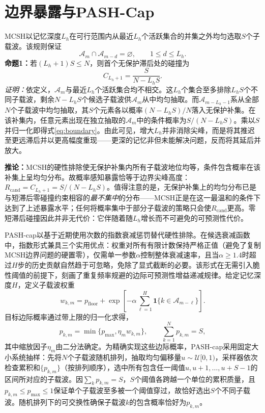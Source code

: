 \documentclass[lettersize,journal]{IEEEtran}
\begin{document}
\section{边界暴露与PASH-Cap}
MCSH以记忆深度$L_h$在可行范围内从最近$L_h$个活跃集合的并集之外均匀选取$S$个子载波。该规则保证
\begin{equation}
\mathcal A_m\cap\mathcal A_{m-d}=\varnothing,\qquad 1\leq d\leq L_h.
\end{equation}
\textbf{命题1：}若$(L_h+1)S\leq N$，则首个无保护滞后处的碰撞为
\begin{equation}
C_{L_h+1}=\frac{S}{N-L_hS}.
\label{eq:boundary}
\end{equation}
\emph{证明：}依定义，$\mathcal A_m$与最近$L_h$个活跃集合均不相交。这$L_h$个集合至多排除$L_hS$个不同子载波，剩余$N-L_hS$个候选子载波供$\mathcal A_m$从中均匀抽取。而$\mathcal A_{m-L_h-1}$系从全部$N$个子载波中均匀抽取，其$S$个元素各以概率$(N-L_hS)/N$落入无保护补集。在该补集内，任意元素出现在独立抽取的$\mathcal A_m$中的条件概率为$S/(N-L_hS)$。乘以$S$并归一化即得式\eqref{eq:boundary}。由此可见，增大$L_h$并非消除尖峰，而是将其推迟至更远滞后并以更高幅度重现——更深的记忆非但未能解决问题，反而将其延后并放大。

\textbf{推论：}MCSH的硬性排除使无保护补集内所有子载波地位均等，条件包含概率在该补集上呈均匀分布。故概率感知暴露恰等于边界尖峰高度：$R_{\mathrm{cand}}=C_{L_h+1}=S/(N-L_hS)$。值得注意的是，无保护补集上的均匀分布已是与短滞后零碰撞约束相容的\emph{最不集中}的分布——MCSH正是在这一最温和的条件下达到了上述暴露水平；任何将概率集中于部分子载波的策略只会使$R_{\mathrm{cand}}$更高。零短滞后碰撞因此并非无代价：它伴随着随$L_h$增长而不可避免的可预测性代价。

PASH-cap以基于近期使用次数的指数衰减惩罚替代硬性排除。在候选衰减函数中，指数形式兼具三个实用优点：权重对所有有限计数保持严格正值（避免了复制MCSH边界问题的硬置零），仅需单一参数$\alpha$控制整体衰减速率，且当$\alpha\geq1.4$时超过$H$步的历史贡献自然趋于可忽略，免除了显式截断的必要。该形式在无需引入脆性阈值的前提下，刻画了重复频率规避的边际可预测性增益递减规律。给定记忆深度$H$，定义子载波权重
\begin{equation}
w_{k,m}=p_{\mathrm{floor}}+
\exp\!\left[-\alpha\sum_{\ell=1}^{H}\mathbf 1\{k\in\mathcal A_{m-\ell}\}\right].
\end{equation}
目标边际概率通过带上限的归一化求得，
\begin{equation}
p_{k,m}=\min\{p_{\max},\eta_m w_{k,m}\},\qquad \sum_{k=1}^{N}p_{k,m}=S,
\label{eq:cap}
\end{equation}
其中缩放因子$\eta_m$由二分法确定。为精确实现这些边际概率，PASH-cap采用固定大小系统抽样：先将$N$个子载波随机排列，抽取均匀偏移量$u\sim\mathcal U[0,1)$，采样器依次检查累积和$\{p_{k,m}\}$（按排列顺序），选中所有包含任一阈值$u,u+1,\ldots,u+S-1$的区间所对应的子载波。因$\sum_k p_{k,m}=S$，$S$个阈值各跨越一个单位的累积质量，且$p_{k,m}\leq p_{\max}\leq1$保证单个子载波至多被一个阈值穿过，故恰好选出$S$个不同子载波。随机排列下的可交换性确保子载波$k$的包含概率恰好为$p_{k,m}$。
\end{document}
